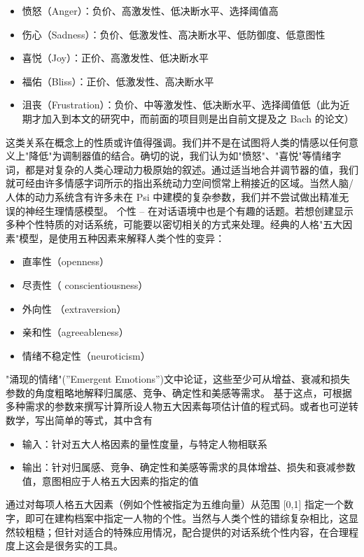 \begin{itemize}
\item 愤怒（Anger）：负价、高激发性、低决断水平、选择阈值高
\item 伤心（Sadness）：负价、低激发性、高决断水平、低防御度、低意图性 
\item 喜悦（Joy）：正价、高激发性、低决断水平
\item 福佑（Bliss）：正价、低激发性、高决断水平
\item 沮丧（Frustration）：负价、中等激发性、低决断水平、选择阈值低（此为近期才加入到本文的研究中，而前面的项目则是出自前文提及之 Bach 的论文）
\end{itemize}

这类关系在概念上的性质或许值得强调。我们并不是在试图将人类的情感以任何意义上"降低"为调制器值的结合。确切的说，我们认为如"愤怒"、"喜悦"等情绪字词，都是对复杂的人类心理动力极原始的叙述。通过适当地合并调节器的值，我们就可经由许多情感字词所示的指出系统动力空间惯常上稍接近的区域。当然人脑/人体的动力系统含有许多未在 Psi 中建模的复杂参数，我们并不尝试做出精准无误的神经生理情感模型。
个性 – 在对话语境中也是个有趣的话题。若想创建显示多种个性特质的对话系统，可能要以密切相关的方式来处理。经典的人格"五大因素"模型，是使用五种因素来解释人类个性的变异：

\begin{itemize}
\item 直率性（openness）
\item 尽责性（ conscientiousness）
\item 外向性 （extraversion）
\item 亲和性（agreeableness）
\item 情绪不稳定性（neuroticism）
\end{itemize}

"涌现的情绪"(”Emergent Emotions”)文中论证，这些至少可从增益、衰减和损失参数的角度粗略地解释归属感、竞争、确定性和美感等需求。 
基于这点，可根据多种需求的参数来撰写计算所设人物五大因素每项估计值的程式码。或者也可逆转数学，写出简单的等式，其中含有

\begin{itemize}
\item 输入：针对五大人格因素的量性度量，与特定人物相联系 
\item 输出：针对归属感、竞争、确定性和美感等需求的具体增益、损失和衰减参数值，意图相应于人格五大因素的指定的值
\end{itemize}

通过对每项人格五大因素（例如个性被指定为五维向量）从范围 [0,1] 指定一个数字，即可在建构档案中指定一人物的个性。当然与人类个性的错综复杂相比，这显然较粗糙；但针对适合的特殊应用情况，配合提供的对话系统个性内容，在合理程度上这会是很务实的工具。


